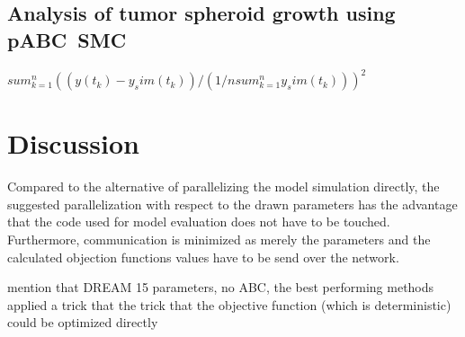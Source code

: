 \documentclass[10pt,letterpaper]{article}
\begin{document}
\subsection*{Analysis of tumor spheroid growth using pABC~SMC}
$sum_{k=1}^n ((y(t_k)-y_sim(t_k))/(1/n sum_{k=1}^n y_sim(t_k)))^2$



\section*{Discussion}

Compared to the alternative of parallelizing the model simulation directly, the suggested parallelization with respect to the drawn parameters has the advantage that the code used for model evaluation does not have to be touched. Furthermore, communication is minimized as merely the parameters and the calculated objection functions values have to be send over the network.

mention that DREAM 15 parameters, no ABC, the best performing methods applied a trick that the trick that the objective function (which is deterministic) could be optimized directly
\end{document}
